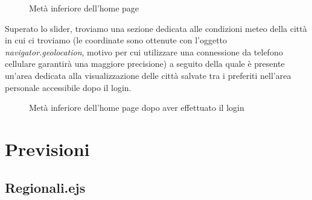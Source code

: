 \newpage
\begin{figure}[ht]
    \centering
    \caption{Metà inferiore dell'home page}
\end{figure}

Superato lo slider, troviamo una sezione dedicata alle condizioni meteo della città in cui ci troviamo 
(le coordinate sono ottenute con l'oggetto \emph{navigator.geolocation}, motivo per cui utilizzare una 
connessione da telefono cellulare garantirà una maggiore precisione) a seguito della quale è presente 
un'area dedicata alla visualizzazione delle città salvate tra i preferiti nell'area personale accessibile 
dopo il login.

\begin{figure}[ht]
    \centering
    \caption{Metà inferiore dell'home page dopo aver effettuato il login}
\end{figure}

\newpage
\section{Previsioni}

\subsection{Regionali.ejs}

